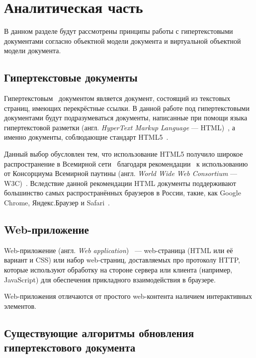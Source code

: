 \section{Аналитическая часть} \label{analysis}

В данном разделе будут рассмотрены принципы работы с гипертекстовыми документами согласно объектной модели документа и виртуальной объектной модели документа.

\subsection{Гипертекстовые документы}

Гипертекстовым~\cite{hypertext} документом является документ, состоящий из текстовых страниц, имеющих перекрёстные ссылки.
В данной работе под гипертекстовыми документами будут подразумеваться документы, написанные при помощи языка гипертекстовой разметки (англ. \textit{HyperText Markup Language} --- HTML)~\cite{html}, а именно документы, соблюдающие стандарт HTML5~\cite{html-doc}.


Данный выбор обусловлен тем, что использование HTML5 получило широкое распространение в Всемирной сети~\cite{internet} благодаря рекомендации~\cite{html-recommendation} к использованию от Консорциума Всемирной паутины (англ. \textit{World Wide Web \newline Consortium} --- W3C)~\cite{w3c}.
Вследствие данной рекомендации HTML документы поддерживают большинство самых распространённых браузеров в России, такие, как Google Chrome, Яндекс.Браузер и Safari~\cite{browser-popularity-russia}.

\subsection{Web-приложение}

Web-приложение (англ. \textit{Web application})~\cite{web-application-definition}  --- web-страница (HTML или её вариант и CSS) или набор web-страниц, доставляемых про протоколу HTTP, которые используют обработку на стороне сервера или клиента (например, \linebreak JavaScript) для обеспечения прикладного взаимодействия в браузере.

Web-приложения отличаются от простого web-контента наличием интерактивных элементов.

\subsection{Существующие алгоритмы обновления гипертекстового документа}

